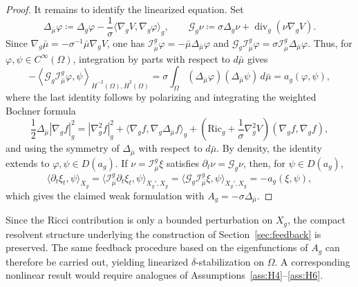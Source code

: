 \documentclass[11pt]{article}
\numberwithin{equation}{section}
\theoremstyle{definition}
\newcommand{\rieszmap}[1][\mu]{\mathcal{I}_{#1}}
\newcommand{\dotHk}[1][k]{\dot{H}^{#1}}
\begin{document}
\begin{proof}
    It remains to identify the linearized equation.
    Set
    \[
    \Delta_{\bar\mu} \varphi \coloneqq \Delta_g \varphi - \frac{1}{\sigma} \langle\nabla_g V, \nabla_g \varphi\rangle_g, \qquad \mathcal{G}_g \nu \coloneqq \sigma \Delta_g \nu + \operatorname{div}_g(\nu \nabla_g V).
    \]
    Since $\nabla_g \bar\mu = -\sigma^{-1}\bar\mu \nabla_g V$, one has $\rieszmap[\bar\mu]^g\varphi = -\bar\mu \Delta_{\bar\mu} \varphi$ and $\mathcal{G}_g \rieszmap[\bar\mu]^g\varphi = \sigma \rieszmap[\bar\mu]^g \Delta_{\bar\mu}\varphi$.
    Thus, for $\varphi, \psi \in C^\infty(\Omega)$, integration by parts with respect to $d\bar\mu$ gives
    \[
    -\left\langle \mathcal{G}_g \rieszmap[\bar\mu]^g \varphi, \psi \right\rangle_{\dot{H}^{-2}(\Omega), \dotHk[2](\Omega)} = \sigma\int_\Omega(\Delta_{\bar\mu} \varphi)(\Delta_{\bar\mu} \psi) \, d\bar\mu = a_g(\varphi,\psi),
    \]
    where the last identity follows by polarizing and integrating the weighted Bochner formula
    \[
    \frac{1}{2} \Delta_{\bar\mu}|\nabla_g f|_g^2 = |\nabla_g^2f|_g^2 + \langle\nabla_g f,\nabla_g \Delta_{\bar\mu} f\rangle_g + \left( \mathrm{Ric}_g + \frac{1}{\sigma} \nabla_g^2 V \right)(\nabla_g f,\nabla_g f),
    \]
    and using the symmetry of $\Delta_{\bar\mu}$ with respect to $d\bar\mu$.
    By density, the identity extends to $\varphi, \psi \in D(a_g)$.
    If $\nu = \rieszmap[\bar\mu]^g\xi$ satisfies $\partial_t\nu = \mathcal{G}_g\nu$, then, for $\psi \in D(a_g)$,
    \[
    \langle \partial_t \xi_t, \psi\rangle_{X_g} = \langle \rieszmap[\bar\mu]^g \partial_t \xi_t, \psi \rangle_{X_g', X_g} = \langle \mathcal{G}_g \rieszmap[\bar\mu]^g\xi, \psi \rangle_{X_g', X_g} = -a_g(\xi, \psi),
    \]
    which gives the claimed weak formulation with $A_g = -\sigma \Delta_{\bar\mu}$.
\end{proof}

Since the Ricci contribution is only a bounded perturbation on $X_g$, the compact resolvent structure underlying the construction of Section~\ref{sec:feedback} is preserved.
The same feedback procedure based on the eigenfunctions of $A_g$ can therefore be carried out, yielding linearized $\delta$-stabilization on $\Omega$. 
A corresponding nonlinear result would require analogues of Assumptions~\ref{ass:H4}--\ref{ass:H6}.
\end{document}
